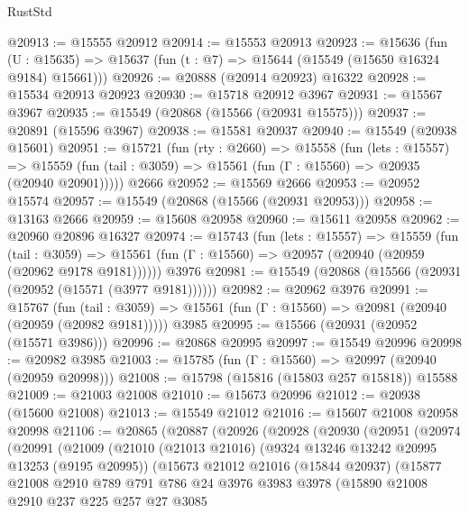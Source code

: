 \begin{lexlean}{RustStd}
\begin{coremodule}
@20913 := @15555 @20912
@20914 := @15553 @20913
@20923 := @15636
    (fun (U : @15635) => @15637 (fun (t : @7) => @15644 (@15549 (@15650 @16324 @9184) @15661)))
@20926 := @20888 (@20914 @20923) @16322
@20928 := @15534 @20913 @20923
@20930 := @15718 @20912 @3967
@20931 := @15567 @3967
@20935 := @15549 (@20868 (@15566 (@20931 @15575)))
@20937 := @20891 (@15596 @3967)
@20938 := @15581 @20937
@20940 := @15549 (@20938 @15601)
@20951 := @15721
    (fun (rty : @2660) =>
    @15558
      (fun (lets : @15557) =>
      @15559 (fun (tail : @3059) => @15561 (fun (Γ : @15560) => @20935 (@20940 @20901)))))
    @2666
@20952 := @15569 @2666
@20953 := @20952 @15574
@20957 := @15549 (@20868 (@15566 (@20931 @20953)))
@20958 := @13163 @2666
@20959 := @15608 @20958
@20960 := @15611 @20958
@20962 := @20960 @20896 @16327
@20974 := @15743
    (fun (lets : @15557) =>
    @15559
      (fun (tail : @3059) =>
      @15561 (fun (Γ : @15560) => @20957 (@20940 (@20959 (@20962 @9178 @9181))))))
    @3976
@20981 := @15549 (@20868 (@15566 (@20931 (@20952 (@15571 (@3977 @9181))))))
@20982 := @20962 @3976
@20991 := @15767
    (fun (tail : @3059) => @15561 (fun (Γ : @15560) => @20981 (@20940 (@20959 (@20982 @9181)))))
    @3985
@20995 := @15566 (@20931 (@20952 (@15571 @3986)))
@20996 := @20868 @20995
@20997 := @15549 @20996
@20998 := @20982 @3985
@21003 := @15785 (fun (Γ : @15560) => @20997 (@20940 (@20959 @20998)))
@21008 := @15798 (@15816 (@15803 @257 @15818)) @15588
@21009 := @21003 @21008
@21010 := @15673 @20996
@21012 := @20938 (@15600 @21008)
@21013 := @15549 @21012
@21016 := @15607 @21008 @20958 @20998
@21106 := @20865
    (@20887
      (@20926
        (@20928
          (@20930
            (@20951
              (@20974
                (@20991
                  (@21009
                    (@21010
                      (@21013 @21016)
                      (@9324 @13246 @13242 @20995 @13253 (@9195 @20995))
                      (@15673
                        @21012
                        @21016
                        (@15844 @20937)
                        (@15877
                          @21008
                          @2910
                          @789
                          @791
                          @786
                          @24
                          @3976
                          @3983
                          @3978
                          (@15890
                            @21008
                            @2910
                            @237
                            @225
                            @257
                            @27
                            @3085

\end{coremodule}
\end{lexlean}
